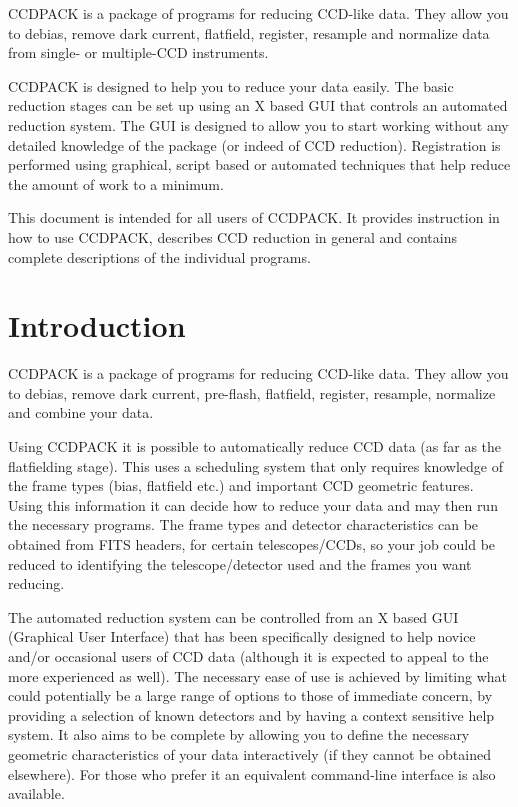 \documentclass[twoside,11pt]{article}
\newcommand{\stardocinitials}  {SUN}
\newcommand{\stardocnumber}    {139.15}
\newcommand{\stardocabstract}  {
CCDPACK is a package of programs for reducing CCD-like data. They
allow you to debias, remove dark current, flatfield, register,
resample and normalize data from single- or multiple-CCD instruments.

CCDPACK is designed to help you to reduce your data easily.
The basic reduction stages can be set up using an X based GUI that
controls an automated reduction system.
The GUI is designed to allow you to start working without any
detailed knowledge of the package (or indeed of CCD reduction).
Registration is performed using graphical, script based or automated
techniques that help reduce the amount of work to a minimum.

This document is intended for all users of CCDPACK.
It provides instruction in how to use CCDPACK, describes CCD reduction
in general and contains complete descriptions of the individual
programs.
}
\newcommand{\stardocname}{\stardocinitials /\stardocnumber}
\newenvironment{latexonly}{}{}
\newcommand{\xlabel}[1]{}
\renewcommand{\_}{\texttt{\symbol{95}}}
\renewcommand{\thepage}{\roman{page}}
\begin{document}
\stardocabstract
  \newpage
  \begin{latexonly}
    \setlength{\parskip}{0mm}
    \tableofcontents
    \setlength{\parskip}{\medskipamount}
    \markboth{\stardocname}{\stardocname}
  \end{latexonly}
\cleardoublepage
\renewcommand{\thepage}{\arabic{page}}
\setcounter{page}{1}

\section{\xlabel{introduction}Introduction}

CCDPACK is a package of programs for reducing CCD-like data. They
allow you to debias, remove dark current, pre-flash, flatfield,
register, resample, normalize and combine your data.

Using CCDPACK it is possible to automatically reduce CCD data (as far
as the flatfielding stage). This uses a scheduling system that only
requires knowledge of the frame types (bias, flatfield etc.) and
important CCD geometric features.
Using this information it can decide how to reduce your data and may
then run the necessary programs.
The frame types and detector characteristics can be obtained from FITS
headers, for certain telescopes/CCDs, so your job could be reduced to
identifying the telescope/detector used and the frames you want
reducing.

The automated reduction system can be controlled from an X based GUI
(Graphical User Interface) that has been specifically designed to
help novice and/or occasional users of CCD data (although it is
expected to appeal to the more experienced as well).
The necessary ease of use is achieved by limiting what could
potentially be a large range of options to those of immediate concern,
by providing a selection of known detectors and by having a context
sensitive help system.
It also aims to be complete by allowing you to define the necessary
geometric characteristics of your data interactively (if they cannot
be obtained elsewhere).
For those who prefer it an equivalent command-line interface is also
available.
\end{document}
